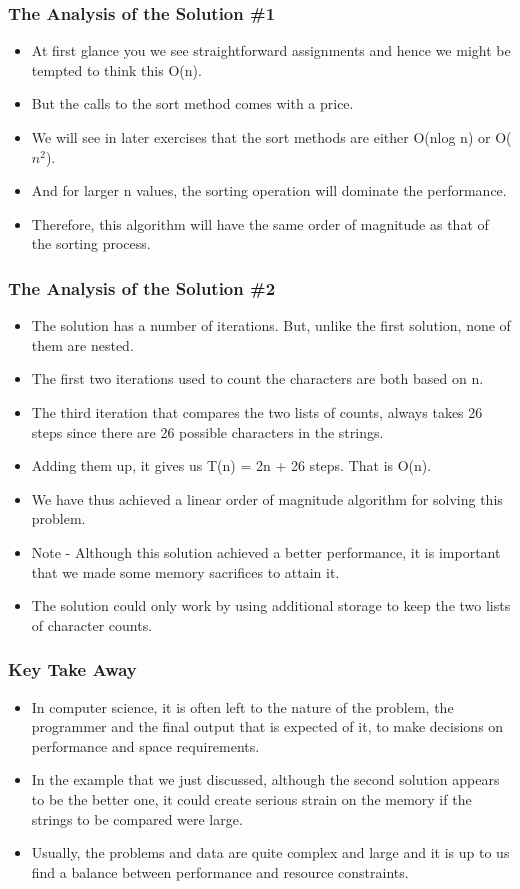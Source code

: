 \documentclass{beamer}
\begin{document}
\begin{frame}
\frametitle{The Analysis of the Solution 
\#1}
\begin{itemize}
\item At first glance you we see straightforward assignments and hence we might be tempted to think this O(n).
\item But the calls to the sort method comes with a price.
\item We will see in later exercises that the sort methods are either O(nlog n) or O($n^2$).
\item And for larger n values, the sorting operation will dominate the performance.
\item Therefore, this algorithm will have the same order of magnitude as that of the sorting process.
\end{itemize}
\end{frame}

\begin{frame}
\frametitle{The Analysis of the Solution 
\#2}
\begin{itemize}
\item The solution has a number of iterations. But, unlike the first solution, none of them
are nested. 
\item The first two iterations used to count the characters are both based on n.
\item The third iteration that compares the two lists of counts, always takes 26 steps since there are 26 possible characters in the strings.
\item Adding them up, it gives us T(n) = 2n + 26 steps. That is O(n).
\item We have thus achieved a linear order of magnitude algorithm for solving this problem.
\item Note - Although this solution achieved a better performance, it is important that we made some memory sacrifices to attain it.
\item The solution could only work by using additional storage to keep the two lists of character counts.
\end{itemize}
\end{frame}

\begin{frame}
\frametitle{Key Take Away}
\begin{itemize}
\item In computer science, it is often left to the nature of the problem, the programmer and the final output that is expected of it, to make decisions on performance and space requirements.
\item In the example that we just discussed, although the second solution appears to be the better one, it could create serious strain on the memory if the strings to be compared were large.
\item Usually, the problems and data are quite complex and large and it is up to us find a balance between performance and resource constraints.
\end{itemize}
\end{frame}
\end{document}
